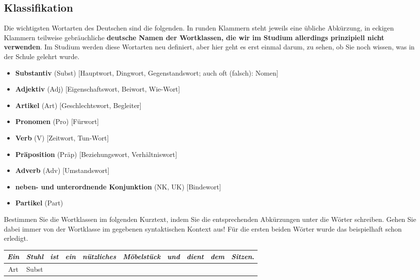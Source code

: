 \documentclass[12pt,a4paper,twoside]{article}
\newcommand{\Zeile}{\vspace{\baselineskip}}
\newcommand{\Lf}{
  \setlength{\itemsep}{1pt}
  \setlength{\parskip}{0pt}
  \setlength{\parsep}{0pt}
}
\begin{document}
\subsection{ Klassifikation}

Die wichtigsten Wortarten des Deutschen sind die folgenden.
In runden Klammern steht jeweils eine übliche Abkürzung, in eckigen Klammern teilweise gebräuchliche \textbf{deutsche Namen der Wortklassen, die wir im Studium allerdings prinzipiell nicht verwenden}.
Im Studium werden diese Wortarten neu definiert, aber hier geht es erst einmal darum, zu sehen, ob Sie noch wissen, was in der Schule gelehrt wurde.

\begin{itemize}\Lf
  \item \textbf{Substantiv} (Subst) [Hauptwort, Dingwort, Gegenstandswort; auch oft (falsch): Nomen]
  \item \textbf{Adjektiv} (Adj) [Eigenschaftswort, Beiwort, Wie-Wort]
  \item \textbf{Artikel} (Art) [Geschlechtswort, Begleiter]
  \item \textbf{Pronomen} (Pro) [Fürwort]
  \item \textbf{Verb} (V) [Zeitwort, Tun-Wort]
  \item \textbf{Präposition} (Präp) [Beziehungswort, Verhältniswort]
  \item \textbf{Adverb} (Adv) [Umstandswort]
  \item \textbf{neben- und unterordnende Konjunktion} (NK, UK) [Bindewort]
  \item \textbf{Partikel} (Part)
\end{itemize}

Bestimmen Sie die Wortklassen im folgenden Kurztext, indem Sie die entsprechenden Abkürzungen unter die Wörter schreiben.
Gehen Sie dabei immer von der Wortklasse im gegebenen syntaktischen Kontext aus!
Für die ersten beiden Wörter wurde das beispielhaft schon erledigt.

\Zeile

\begin{center}
  \large
  \begin{tabular}[h]{|c|c|c|c|c|c|c|c|c|c|}
    \hline
      \textit{Ein} & \textit{Stuhl} & \textit{ist} & \textit{ein} & \textit{nützliches} & \textit{Möbelstück} & \textit{und} & \textit{dient} & \textit{dem} & \textit{Sitzen}. \\
      \hline
      Art & Subst &&&&&&&& \\
    \hline
  \end{tabular}
\end{center}
\end{document}
